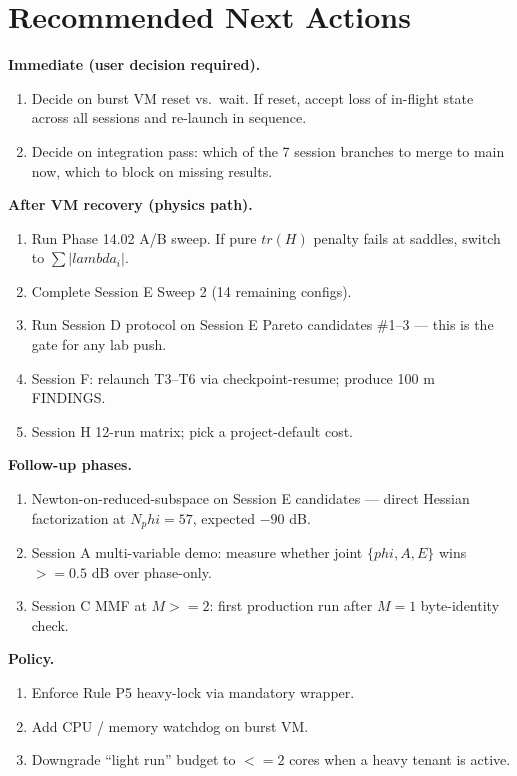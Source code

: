 \documentclass[11pt,letterpaper]{article}
\def\varphi{phi}%
\def\mathrm#1{#1}%
\def\lambda{lambda}%
\def\geq{>=}%
\def\leq{<=}%
\def\texttt#1{#1}%
\begin{document}
\newpage
\section{Recommended Next Actions}

\textbf{Immediate (user decision required).}
\begin{enumerate}[leftmargin=*]
  \item Decide on burst VM reset vs.\ wait. If reset, accept loss of in-flight state across all sessions and re-launch in sequence.
  \item Decide on integration pass: which of the 7 session branches to merge to \texttt{main} now, which to block on missing results.
\end{enumerate}

\textbf{After VM recovery (physics path).}
\begin{enumerate}[leftmargin=*,resume]
  \item Run Phase 14.02 A/B sweep. If pure $\mathrm{tr}(H)$ penalty fails at saddles, switch to $\sum |\lambda_i|$.
  \item Complete Session E Sweep 2 (14 remaining configs).
  \item Run Session D protocol on Session E Pareto candidates \#1--3 --- this is the gate for any lab push.
  \item Session F: relaunch T3--T6 via checkpoint-resume; produce 100 m FINDINGS.
  \item Session H 12-run matrix; pick a project-default cost.
\end{enumerate}

\textbf{Follow-up phases.}
\begin{enumerate}[leftmargin=*,resume]
  \item Newton-on-reduced-subspace on Session E candidates --- direct Hessian factorization at $\mathrm{N}_\varphi = 57$, expected $-90$ dB.
  \item Session A multi-variable demo: measure whether joint $\{\varphi, A, E\}$ wins $\geq 0.5$ dB over phase-only.
  \item Session C MMF at $M \geq 2$: first production run after $M = 1$ byte-identity check.
\end{enumerate}

\textbf{Policy.}
\begin{enumerate}[leftmargin=*,resume]
  \item Enforce Rule P5 heavy-lock via mandatory wrapper.
  \item Add CPU / memory watchdog on burst VM.
  \item Downgrade ``light run'' budget to $\leq 2$ cores when a heavy tenant is active.
\end{enumerate}
\end{document}
